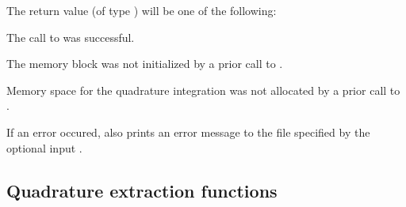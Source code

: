 {
  The return value  (of type ) will be one of the following:
  \begin{args}
  \item[\Id{CV\_SUCCESS}]
    The call to  was successful.
  \item[\Id{CV\_MEM\_NULL}] 
    The {\cvodes} memory block was not initialized by a prior
    call to .
  \item[\Id{CV\_NO\_QUAD}] 
    Memory space for the quadrature integration was not allocated by a prior
    call to .
  \end{args}
}
{
  If an error occured,  also prints an error message to the
  file specified by the optional input .
}


\subsection{Quadrature extraction functions}\label{ss:quad_get}

